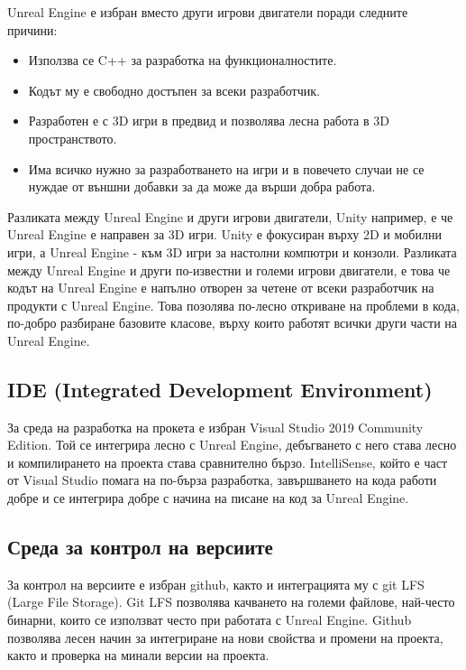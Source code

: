 \documentclass[14pt]{extreport}
\begin{document}
Unreal Engine е избран вместо други игрови двигатели поради следните причини: 

\begin{itemize}
	\item Използва се C++ за разработка на функционалностите.
	\item Кодът му е свободно достъпен за всеки разработчик.
	\item Разработен е с 3D игри в предвид и позволява лесна работа в 3D пространството.
	\item Има всичко нужно за разработването на игри и в повечето случаи не се нуждае от външни добавки за да може да върши добра работа.
\end{itemize}

Разликата между Unreal Engine и други игрови двигатели, Unity например, е че Unreal Engine е направен за 3D игри. Unity е фокусиран върху 2D и мобилни игри, а Unreal Engine - към 3D игри за настолни компютри и конзоли. Разликата между Unreal Engine и други по-известни и големи игрови двигатели, е това че кодът на Unreal Engine е напълно отворен за четене от всеки разработчик на продукти с Unreal Engine.
Това позолява по-лесно откриване на проблеми в кода, по-добро разбиране базовите класове, върху които работят всички други части на Unreal Engine.

\subsection{IDE (Integrated Development Environment)}

За среда на разработка на прокета е избран Visual Studio 2019 Community Edition. Той се интегрира лесно с Unreal Engine, дебъгването с него става лесно и компилирането на проекта става сравнително бързо. IntelliSense, който е част от Visual Studio помага на по-бърза разработка, завършването на кода работи добре и се интегрира добре с начина на писане на код за Unreal Engine. 

\subsection{Среда за контрол на версиите}

За контрол на версиите е избран github, както и интеграцията му с git LFS (Large File Storage). Git LFS позволява качването на големи файлове, най-често бинарни, които се използват често при работата с Unreal Engine. Github позволява лесен начин за интегриране на нови свойства и промени на проекта, както и проверка на минали версии на проекта.
\end{document}
